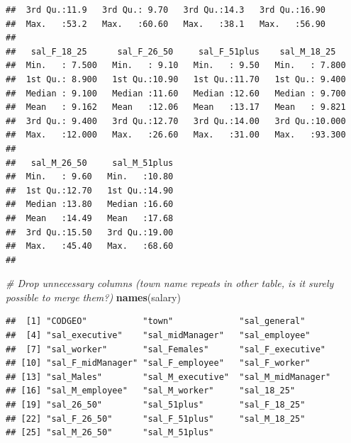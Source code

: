 \documentclass[]{article}
\newenvironment{Shaded}{\begin{snugshade}}{\end{snugshade}}
\newcommand{\KeywordTok}[1]{\textcolor[rgb]{0.13,0.29,0.53}{\textbf{#1}}}
\newcommand{\StringTok}[1]{\textcolor[rgb]{0.31,0.60,0.02}{#1}}
\newcommand{\CommentTok}[1]{\textcolor[rgb]{0.56,0.35,0.01}{\textit{#1}}}
\newcommand{\OperatorTok}[1]{\textcolor[rgb]{0.81,0.36,0.00}{\textbf{#1}}}
\newcommand{\NormalTok}[1]{#1}
\begin{document}
\begin{verbatim}
##  3rd Qu.:11.9   3rd Qu.: 9.70   3rd Qu.:14.3   3rd Qu.:16.90  
##  Max.   :53.2   Max.   :60.60   Max.   :38.1   Max.   :56.90  
##                                                               
##   sal_F_18_25      sal_F_26_50     sal_F_51plus    sal_M_18_25    
##  Min.   : 7.500   Min.   : 9.10   Min.   : 9.50   Min.   : 7.800  
##  1st Qu.: 8.900   1st Qu.:10.90   1st Qu.:11.70   1st Qu.: 9.400  
##  Median : 9.100   Median :11.60   Median :12.60   Median : 9.700  
##  Mean   : 9.162   Mean   :12.06   Mean   :13.17   Mean   : 9.821  
##  3rd Qu.: 9.400   3rd Qu.:12.70   3rd Qu.:14.00   3rd Qu.:10.000  
##  Max.   :12.000   Max.   :26.60   Max.   :31.00   Max.   :93.300  
##                                                                   
##   sal_M_26_50     sal_M_51plus  
##  Min.   : 9.60   Min.   :10.80  
##  1st Qu.:12.70   1st Qu.:14.90  
##  Median :13.80   Median :16.60  
##  Mean   :14.49   Mean   :17.68  
##  3rd Qu.:15.50   3rd Qu.:19.00  
##  Max.   :45.40   Max.   :68.60  
## 
\end{verbatim}

\begin{Shaded}
\begin{Highlighting}[]
\CommentTok{# Drop unnecessary columns (town name repeats in other table, is it surely possible to merge them?)}
\KeywordTok{names}\NormalTok{(salary)}
\end{Highlighting}
\end{Shaded}

\begin{verbatim}
##  [1] "CODGEO"           "town"             "sal_general"     
##  [4] "sal_executive"    "sal_midManager"   "sal_employee"    
##  [7] "sal_worker"       "sal_Females"      "sal_F_executive" 
## [10] "sal_F_midManager" "sal_F_employee"   "sal_F_worker"    
## [13] "sal_Males"        "sal_M_executive"  "sal_M_midManager"
## [16] "sal_M_employee"   "sal_M_worker"     "sal_18_25"       
## [19] "sal_26_50"        "sal_51plus"       "sal_F_18_25"     
## [22] "sal_F_26_50"      "sal_F_51plus"     "sal_M_18_25"     
## [25] "sal_M_26_50"      "sal_M_51plus"
\end{verbatim}

\begin{Shaded}
\end{Shaded}
\end{document}
